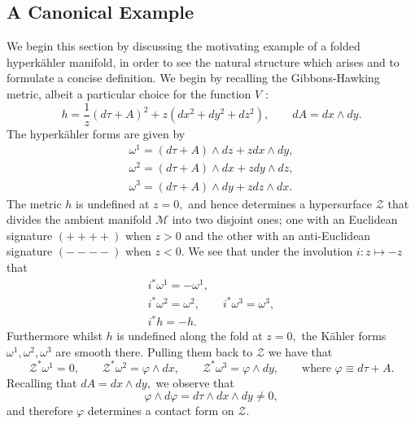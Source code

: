 \documentclass[a4paper,12pt, onecolumn, notitlepage]{article}
\theoremstyle{definition}
\theoremstyle{remark}
\newcommand{\w}{\omega}
\newcommand{\K}{K\"ahler }
\newcommand{\HK}{hyperk\"ahler }
\newcommand{\vp}{\varphi}
\begin{document}
\subsection{A Canonical Example}
We begin this section by discussing the motivating example of a folded \HK manifold, in order to see the natural structure which arises and to formulate a concise definition. We begin by recalling the Gibbons-Hawking metric, albeit a particular choice for the function $V$ \cite{hitchin_2015}:
\begin{equation}
	h = \frac{1}{z}(d\tau + A)^{2} + z(dx^{2} + dy^{2} + dz^{2}), \qquad dA = dx\wedge dy.
\end{equation} 
The \HK forms are given by
\begin{subequations}
	\begin{align}
	\w^{1} = (d\tau+A)\wedge dz + z dx\wedge dy,\\
	\w^{2} = (d\tau+A)\wedge dx + z dy\wedge dz,\\
	\w^{3} = (d\tau+A)\wedge dy + z dz\wedge dx.
	\end{align}
\end{subequations}
The metric $h$ is undefined at $z=0,$ and hence determines a hypersurface $\mathcal{Z}$ that divides the ambient manifold $\mathcal{M}$ into two disjoint ones; one with an Euclidean signature $(++++)$ when $z>0$ and the other with an anti-Euclidean signature $(----)$ when $z<0.$ We see that under the involution $i:z\mapsto-z$ that
\begin{subequations}
	\begin{gather}
	\label{hk_involution}
	i^{\ast}\w^{1} = -\w^{1},\\
	i^{\ast}\w^{2} = \w^{2},\qquad
	i^{\ast}\w^{3} = \w^{3},\\
	i^{\ast}h = -h.
	\end{gather}
\end{subequations}
Furthermore whilst $h$ is undefined along the fold at $z=0,$ the \K forms $\w^{1}, \w^{2}, \w^{3}$ are smooth there. Pulling them back to $\mathcal{Z}$ we have that
\begin{equation}
	\label{pullback_GH}
	\mathcal{Z}^{\ast}\w^{1} = 0,\qquad \mathcal{Z}^{\ast}\w^{2} = \vp\wedge dx,\qquad \mathcal{Z}^{\ast}\w^{3} = \vp\wedge dy,\qquad \text{where } \vp\equiv d\tau + A.
\end{equation}
Recalling that $dA = dx\wedge dy,$ we observe that
\begin{equation}
	\label{contact}
	\vp\wedge d\vp = d\tau\wedge dx \wedge dy \neq 0,
\end{equation}
	and therefore $\vp$ determines a contact form on  $\mathcal{Z}.$
	
\end{document}
